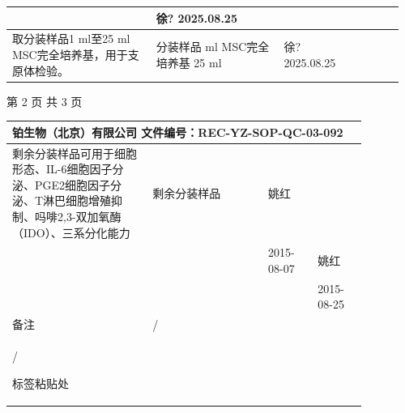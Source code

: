 \documentclass[UTF8,10pt,a4paper,fontset=fandol]{ctexart}
\newcommand{\fieldvalue}[1]{#1}
\newcommand{\handwritten}[1]{#1}
\begin{document}
\begin{tabular}{|p{0.36\linewidth}|p{0.32\linewidth}|p{0.14\linewidth}|p{0.14\linewidth}|}
&
\fieldvalue{\handwritten{徐?}}\newline
\fieldvalue{\handwritten{2025.08.25}}
&
\\ \hline
取分装样品1 ml至25 ml MSC完全培养基，用于支原体检验。&
分装样品 \underline{\hspace{1cm}} ml\newline
MSC完全培养基
\fieldvalue{\handwritten{25}} ml
&
\fieldvalue{\handwritten{徐?}}\newline
\fieldvalue{\handwritten{2025.08.25}}
&
\\ \hline
\end{tabular}

\vfill
\begin{center}
第 2 页 共 3 页
\end{center}

\newpage

\begin{center}
\small
\begin{tabular}{|p{0.34\linewidth}|p{0.29\linewidth}|p{0.12\linewidth}|p{0.12\linewidth}|}
\hline
\multicolumn{4}{l}{铂生物（北京）有限公司 \hfill 文件编号：REC-YZ-SOP-QC-03-092} \\[-1mm]
\hline
剩余分装样品可用于细胞形态、IL-6细胞因子分泌、PGE2细胞因子分泌、T淋巴细胞增殖抑制、吗啡2,3-双加氧酶（IDO）、三系分化能力
&
剩余分装样品
&
\fieldvalue{\handwritten{姚红}}
& \\[-1mm]
&
&
\fieldvalue{\handwritten{2015-08-07}}
&
\fieldvalue{\handwritten{姚红}}
\\[-1mm]
&
&
&
\fieldvalue{\handwritten{2015-08-25}}
\\
\hline
备注
&
\handwritten{/}
&
&
\\
\hline
\multicolumn{4}{p{0.93\linewidth}|}{\vspace{5cm}
\handwritten{/}
\hfill
\begin{center}
标签粘贴处
\end{center}
\vspace{1cm}}\\
\hline
\end{tabular}
\end{center}
\end{document}
